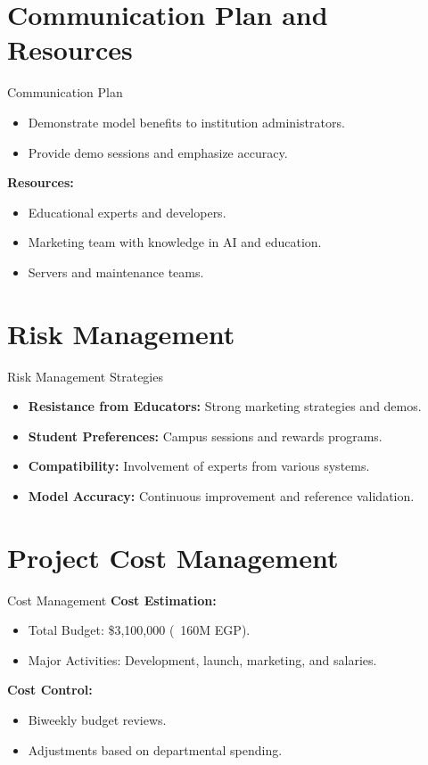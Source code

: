 \documentclass[aspectratio=169]{beamer}
\begin{document}
\section{Communication Plan and Resources}
\begin{frame}{Communication Plan}
  \begin{itemize}
    \item Demonstrate model benefits to institution administrators.
    \item Provide demo sessions and emphasize accuracy.
  \end{itemize}
  \textbf{Resources:}
  \begin{itemize}
    \item Educational experts and developers.
    \item Marketing team with knowledge in AI and education.
    \item Servers and maintenance teams.
  \end{itemize}
\end{frame}

\section{Risk Management}
\begin{frame}{Risk Management Strategies}
  \begin{itemize}
    \item \textbf{Resistance from Educators:} Strong marketing strategies and demos.
    \item \textbf{Student Preferences:} Campus sessions and rewards programs.
    \item \textbf{Compatibility:} Involvement of experts from various systems.
    \item \textbf{Model Accuracy:} Continuous improvement and reference validation.
  \end{itemize}
\end{frame}

\section{Project Cost Management}
\begin{frame}{Cost Management}
  \textbf{Cost Estimation:}
  \begin{itemize}
    \item Total Budget: \$3,100,000 (~160M EGP).
    \item Major Activities: Development, launch, marketing, and salaries.
  \end{itemize}
  \textbf{Cost Control:}
  \begin{itemize}
    \item Biweekly budget reviews.
    \item Adjustments based on departmental spending.
  \end{itemize}
\end{frame}
\end{document}
